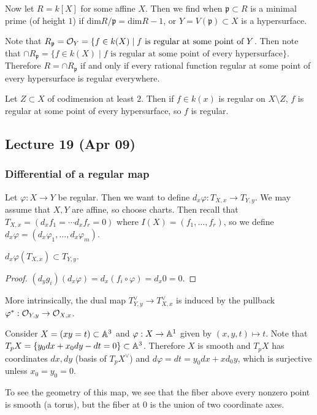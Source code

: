 \documentclass[twoside, 10pt]{article}
\begin{document}
    Now let $R=k[X]$ for some affine $X$. Then we find when $\mathfrak{p} \subset R$ is a minimal prime (of height $1$) if $\mathrm{dim} R/\mathfrak{p} = \mathrm{dim} R - 1$, or $Y = V(\mathfrak{p}) \subset X$ is a hypersurface.

    Note that $R_{\mathfrak{p}} = \mathcal{O}_Y = \{ f \in k(X) \mid f \text{ is regular at some point of } Y$.
        Then note that $\cap R_{\mathfrak{p}} = \{f \in k(X) \mid f \text{ is regular at some point of every hypersurface}\}$. Therefore $R = \cap R_{\mathfrak{p}}$ if and only if every rational function regular at some point of every hypersurface is regular everywhere.

        \begin{thm}
            Let $Z \subset X$ of codimension at least $2$. Then if $f \in k(x)$ is regular on $X \setminus Z$, $f$ is regular at some point of every hypersurface, so $f$ is regular.
        \end{thm}

        \subsection{Lecture 19 (Apr 09)}
        \subsubsection{Differential of a regular map}
        Let $\varphi:X \to Y$ be regular. Then we want to define $d_x \varphi: T_{X,x} \to T_{Y,y}$. We may assume that $X,Y$ are affine, so choose charts. Then recall that $T_{X,x} = (d_xf_1 = \cdots d_xf_r = 0)$ where $I(X) = (f_1, \ldots, f_r)$, so we define $d_x \varphi = (d_x \varphi_1, \ldots, d_x\varphi_m)$. 

        \begin{prop}
            $d_x \varphi(T_{X,x}) \subset T_{Y,y}$. 
            \begin{proof}
                $(d_yg_i)(d_x \varphi) = d_x (f_i \circ \varphi) = d_x 0 = 0$.
            \end{proof}
        \end{prop}

        More intrinsically, the dual map $T_{Y,y}^{\vee} \to T_{X,x}^{\vee}$ is induced by the pullback $\varphi^*: \mathcal{O}_{Y,y} \to \mathcal{O}_{X,x}$.

        \begin{exm}
            Consider $X = (xy=t) \subset \mathbb{A}^3$ and $\varphi:X \to \mathbb{A}^1$ given by $(x,y,t) \mapsto t$. Note that $T_pX = \{y_0dx + x_0dy - dt = 0 \} \subset \mathbb{A}^3$. Therefore $X$ is smooth and $T_pX$ has coordinates $dx,dy$ (basis of $T_p X^{\vee}$) and $d\varphi = dt = y_0dx+xd_0y$, which is surjective unless $x_0=y_0=0$.

            To see the geometry of this map, we see that the fiber above every nonzero point is smooth (a torus), but the fiber at $0$ is the union of two coordinate axes.
        \end{exm}
\end{document}
